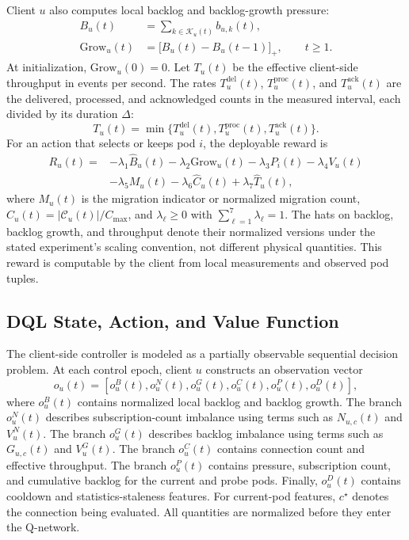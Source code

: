 \documentclass[manuscript]{acmart}
\begin{document}
Client $u$ also computes local backlog and backlog-growth pressure:
\begin{align}
	B_u(t) &= \sum_{k\in\mathcal{K}_u(t)} b_{u,k}(t),\\
	\mathrm{Grow}_u(t) &= \bigl[B_u(t)-B_u(t-1)\bigr]_+,\qquad t\geq1.
\end{align}
At initialization, $\mathrm{Grow}_u(0)=0$. Let $T_u(t)$ be the effective client-side
throughput in events per second. The rates $T^{\mathrm{del}}_u(t)$, $T^{\mathrm{proc}}_u(t)$,
and $T^{\mathrm{ack}}_u(t)$ are the delivered, processed, and acknowledged counts in
the measured interval, each divided by its duration $\Delta$:
\begin{equation}
	T_u(t)=
	\min\{T^{\mathrm{del}}_u(t),T^{\mathrm{proc}}_u(t),T^{\mathrm{ack}}_u(t)\}.
\end{equation}
For an action that selects or keeps pod $i$, the deployable reward is
\begin{align}
	R_u(t)=
	&-\lambda_1\widehat{B}_u(t)
	-\lambda_2\widehat{\mathrm{Grow}}_u(t)
	-\lambda_3 P_i(t)
	-\lambda_4 V_u(t) \nonumber\\
	&-\lambda_5 M_u(t)
	-\lambda_6\widehat{C}_u(t)
	+\lambda_7\widehat{T}_u(t),
	\label{eq:deployable_reward}
\end{align}
where $M_u(t)$ is the migration indicator or normalized migration count,
$\widehat{C}_u(t)=|\mathcal{C}_u(t)|/C_{\max}$, and
$\lambda_\ell\geq0$ with $\sum_{\ell=1}^{7}\lambda_\ell=1$.
The hats on backlog, backlog growth, and throughput denote their normalized
versions under the stated experiment's scaling convention, not different
physical quantities. This reward is computable by the client from
local measurements and observed pod tuples.

\subsection{DQL State, Action, and Value Function}

The client-side controller is modeled as a partially observable sequential
decision problem. At each control epoch, client $u$ constructs an observation
vector
\begin{equation}
	o_u(t)=
	\left[
	o^B_u(t),o^N_u(t),o^G_u(t),o^C_u(t),o^P_u(t),o^D_u(t)
	\right],
	\label{eq:dql_observation}
\end{equation}
where $o^B_u(t)$ contains normalized local backlog and backlog growth.
The branch $o^N_u(t)$ describes subscription-count imbalance using terms such as
$N_{u,c}(t)$ and $V^N_u(t)$. The branch $o^G_u(t)$ describes backlog imbalance
using terms such as $G_{u,c}(t)$ and $V^G_u(t)$.
The branch $o^C_u(t)$ contains connection count and effective throughput.
The branch $o^P_u(t)$ contains pressure, subscription count, and cumulative
backlog for the current and probe pods. Finally, $o^D_u(t)$ contains cooldown
and statistics-staleness features. For current-pod features, $c^\star$ denotes
the connection being evaluated. All quantities are normalized before they
enter the Q-network.
\end{document}
